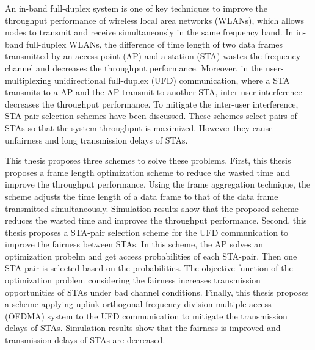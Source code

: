 \documentclass[master]{kuisthesis}		%
\begin{document}
\begin{eabstract}				%
	An in-band full-duplex system is one of key techniques to improve the throughput performance of wireless local area networks (WLANs), which allows nodes to transmit and receive simultaneously in the same frequency band. In in-band full-duplex WLANs, the difference of time length of two data frames transmitted by an access point (AP) and a station (STA) wastes the frequency channel and decreases the throughput performance. Moreover, in the user-multiplexing unidirectional full-duplex (UFD) communication,  where a STA transmits to a AP and the AP transmit to another STA, inter-user interference decreases the throughput performance. To mitigate the inter-user interference, STA-pair selection schemes have been discussed.
	These schemes select pairs of STAs so that the system throughput is maximized.
	However they cause unfairness and long transmission delays of STAs.
	\par
	This thesis proposes three schemes to solve these problems. First, this thesis proposes a frame length optimization scheme to reduce the wasted time and improve the throughput performance. Using the frame aggregation technique, the scheme adjusts the time length of a data frame to that of the data frame transmitted simultaneously. Simulation results show that the proposed scheme reduces the wasted time and improves the throughput performance. Second, this thesis proposes a STA-pair selection scheme for the UFD communication to improve the fairness between STAs. In this scheme, the AP solves an optimization probelm and get access probabilities of each STA-pair. Then one STA-pair is selected based on the probabilities. The objective function of the optimization problem considering the fairness increases transmission opportunities of STAs under bad channel conditions.
	Finally, this thesis proposes a scheme applying uplink orthogonal frequency division multiple access (OFDMA) system to the UFD communication to mitigate the transmission delays of STAs.
	Simulation results show that the fairness is improved and transmission delays of STAs are decreased.\\
\end{eabstract}

\tableofcontents				%

\end{document}
